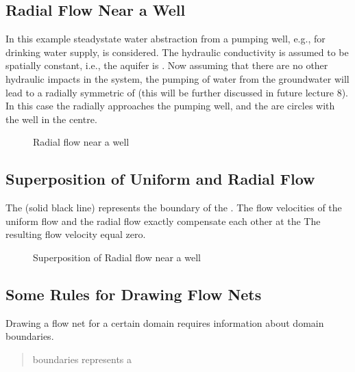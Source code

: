 \documentclass[letterpaper,10pt,english]{jupyterBook}
\begin{document}
\subsection{Radial Flow Near a Well}
\label{\detokenize{content/flow/L6/16_darcy_law_3D:radial-flow-near-a-well}}
\sphinxAtStartPar
In this example steady\sphinxhyphen{}state water abstraction from a pumping well, e.g., for drinking water supply, is considered. The hydraulic conductivity is assumed to be spatially constant, i.e., the aquifer is . Now assuming that there are no other hydraulic impacts in the system, the pumping of water from the groundwater will lead to a radially symmetric  of  (this will be further discussed in future lecture 8). In this case the  radially approaches the pumping well, and the  are circles with the well in the centre.

\begin{figure}[htbp]
\centering
\capstart

\noindent{}
\caption{Radial flow near a well}\label{\detokenize{content/flow/L6/16_darcy_law_3D:id1}}\end{figure}


\subsection{Superposition of Uniform and Radial Flow}
\label{\detokenize{content/flow/L6/16_darcy_law_3D:superposition-of-uniform-and-radial-flow}}
\sphinxAtStartPar
The  (solid black line) represents the boundary of the . The flow velocities of the uniform flow and the radial flow exactly compensate each other at the  The resulting flow velocity equal zero.

\begin{figure}[htbp]
\centering
\capstart

\noindent{}
\caption{Superposition of Radial flow near a well}\label{\detokenize{content/flow/L6/16_darcy_law_3D:radial-flow}}\end{figure}


\subsection{Some Rules for Drawing Flow Nets}
\label{\detokenize{content/flow/L6/16_darcy_law_3D:some-rules-for-drawing-flow-nets}}
\sphinxAtStartPar
Drawing a flow net for a certain domain requires information about domain boundaries.
\begin{quote}

\sphinxAtStartPar
{} boundaries represents a 
\end{quote}
\end{document}
